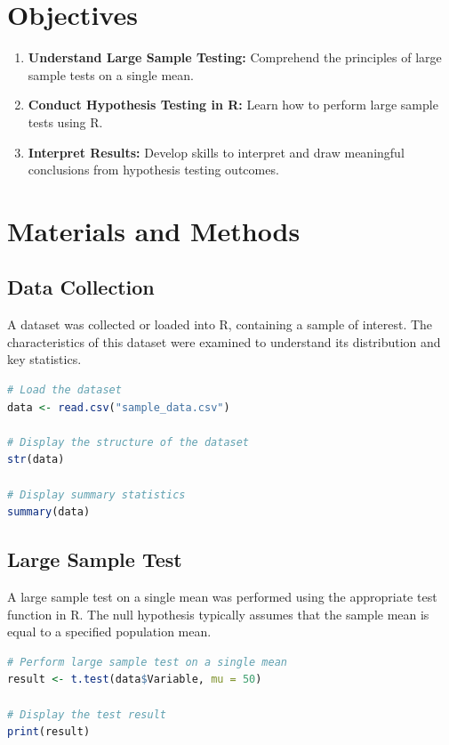 \documentclass[10pt]{book}
\begin{document}
\section{Objectives}

\begin{enumerate}
    \item \textbf{Understand Large Sample Testing:} Comprehend the principles of large sample tests on a single mean.
    \item \textbf{Conduct Hypothesis Testing in R:} Learn how to perform large sample tests using R.
    \item \textbf{Interpret Results:} Develop skills to interpret and draw meaningful conclusions from hypothesis testing outcomes.
\end{enumerate}

\section{Materials and Methods}

\subsection{Data Collection}

A dataset was collected or loaded into R, containing a sample of interest. The characteristics of this dataset were examined to understand its distribution and key statistics.

\begin{lstlisting}[language=R]
# Load the dataset
data <- read.csv("sample_data.csv")

# Display the structure of the dataset
str(data)

# Display summary statistics
summary(data)
\end{lstlisting}

\subsection{Large Sample Test}

A large sample test on a single mean was performed using the appropriate test function in R. The null hypothesis typically assumes that the sample mean is equal to a specified population mean.

\begin{lstlisting}[language=R]
# Perform large sample test on a single mean
result <- t.test(data$Variable, mu = 50)

# Display the test result
print(result)
\end{lstlisting}
\end{document}

